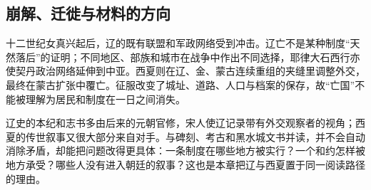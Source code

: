 \subsection{崩解、迁徙与材料的方向}

十二世纪女真兴起后，辽的既有联盟和军政网络受到冲击。辽亡不是某种制度“天然落后”的证明；不同地区、部族和城市在战争中作出不同选择，耶律大石西行亦使契丹政治网络延伸到中亚。西夏则在辽、金、蒙古连续重组的夹缝里调整外交，最终在蒙古扩张中覆亡。征服改变了城址、道路、人口与档案的保存，故“亡国”不能被理解为居民和制度在一日之间消失。

辽史的本纪和志书多由后来的元朝官修，宋人使辽记录带有外交观察者的视角；西夏的传世叙事又很大部分来自对手。与碑刻、考古和黑水城文书并读，并不会自动消除矛盾，却能把问题改得更具体：一条制度在哪些地方被实行？一个和约怎样被地方承受？哪些人没有进入朝廷的叙事？这也是本章把辽与西夏置于同一阅读路径的理由。
